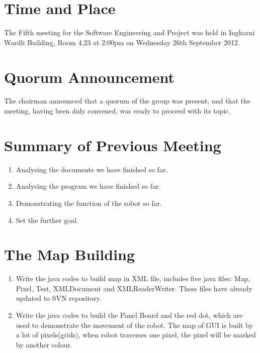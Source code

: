 \documentclass[11pt, a4paper]{article}
\begin{document}
\section{Time and Place}
The Fifth meeting for the Software Engineering and Project was held in Ingkarni Wardli Building, Room 4.23 at 2:00pm on Wednesday 26th September 2012.


\section{Quorum Announcement}
The chairman announced that a quorum of the group was present, and that the meeting, having been duly convened, was ready to proceed with its topic.

\section{Summary of Previous Meeting}
\begin{enumerate}
\item Analysing the documents we have finished so far.
\item Analysing the program we have finished so far.
\item Demonstrating the function of the robot so far.
\item Set the further goal.
\end{enumerate}
 

\section{The Map Building}
\begin{enumerate}
\item Write the java codes to build map in XML file, includes five java files: Map, Pixel, Test, XMLDocument and XMLReaderWriter. These files have already updated to SVN repository.

\item Write the java codes to build the Panel Board and the red dot, which are used to demonstrate the movement of the robot. The map of GUI is built by a lot of pixels(grids), when robot traverses one pixel, the pixel will be marked by another colour.

\end{enumerate}
\end{document}
